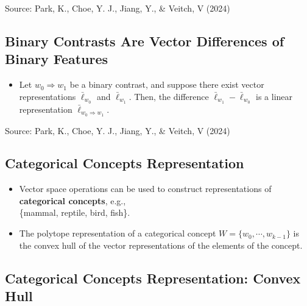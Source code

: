 \documentclass[
  letterpaper,
  DIV=11,
  numbers=noendperiod]{scrartcl}
\providecommand{\tightlist}{%
  \setlength{\itemsep}{0pt}\setlength{\parskip}{0pt}}\usepackage{longtable,booktabs,array}
\begin{document}
Source: Park, K., Choe, Y. J., Jiang, Y., \& Veitch, V (2024)

\subsection{Binary Contrasts Are Vector Differences of Binary
Features}\label{binary-contrasts-are-vector-differences-of-binary-features}

\begin{itemize}
\tightlist
\item
  Let \(w_0 \Rightarrow w_1\) be a binary contrast, and suppose there
  exist vector representations \(\bar{\ell}_{w_0}\) and
  \(\bar{\ell}_{w_1}\). Then, the difference
  \(\bar{\ell}_{w_1} - \bar{\ell}_{w_0}\) is a linear representation
  \(\bar{\ell}_{w_0 \Rightarrow w_1}\).
\end{itemize}

Source: Park, K., Choe, Y. J., Jiang, Y., \& Veitch, V (2024)

\subsection{Categorical Concepts
Representation}\label{categorical-concepts-representation}

\begin{itemize}
\tightlist
\item
  Vector space operations can be used to construct representations of
  \textbf{categorical concepts}, e.g.,\\
  \{mammal, reptile, bird, fish\}.
\item
  The polytope representation of a categorical concept
  \(W = \{w_0,\cdots , w_{k−1} \}\) is the convex hull of the vector
  representations of the elements of the concept.
\end{itemize}

\subsection{Categorical Concepts Representation: Convex
Hull}\label{categorical-concepts-representation-convex-hull}
\end{document}
